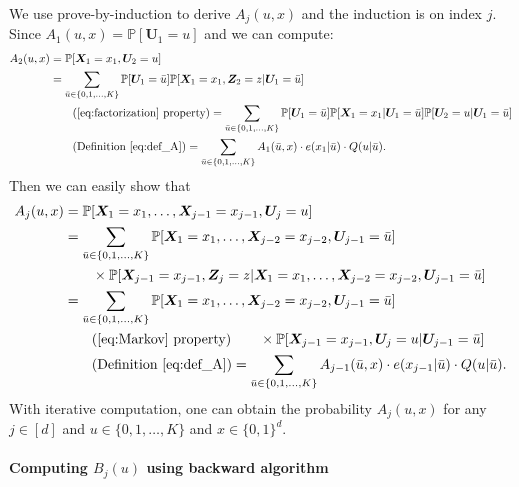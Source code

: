\documentclass[12pt]{article}
\theoremstyle{definition}
\def\P{\mathbb{P}}
\def\P{\mathbb{P}}
\renewcommand{\P}{\mathbb{P}}							%
\newcommand{\prx}{\bm X}								%
\newcommand{\prz}{\bm Z}								%
\newcommand{\pru}{{\bm U}}								%
\begin{document}
We use prove-by-induction to derive $A_j(u,x)$ and the induction is on index $j$. Since $A_1(u,x)=\P[\pru_1=u]$ and we can compute:
\begin{align*}
	A_2(u,x)
	&
	=\P[\prx_1=x_1,\pru_2=u]\\
	&
	=\sum_{\bar u\in\{0,1,\ldots,K\}}\P[\pru_1=\bar u]\P[\prx_1=x_1,\prz_2=z|\pru_1=\bar u]\\
	&\tag{\ref{eq:factorization} property}
	=\sum_{\bar u\in\{0,1,\ldots,K\}}\P[\pru_1=\bar u]\P[\prx_1=x_1|\pru_1=\bar u]\P[\pru_2=u|\pru_1=\bar u]\\
	&\tag{Definition \eqref{eq:def_A}}
	=\sum_{\bar u\in\{0,1,\ldots,K\}}A_1(\bar u,x)\cdot e(x_1|\bar u)\cdot Q(u|\bar u).
\end{align*}
Then we can easily show that 
\begin{align*}
	A_j(u,x)
	&
	=\P[\prx_{1}=x_1,\ldots, \prx_{j-1}=x_{j-1},\pru_{j}=u]\\
	&
	=\sum_{\bar u\in\{0,1,\ldots,K\}}\P[\prx_{1}=x_1,\ldots, \prx_{j-2}=x_{j-2},\pru_{j-1}=\bar u]\\
	&
	\qquad\times\P[\prx_{j-1}=x_{j-1},\prz_{j}=z|\prx_{1}=x_1,\ldots, \prx_{j-2}=x_{j-2},\pru_{j-1}=\bar u]\\
	&
	=\sum_{\bar u\in\{0,1,\ldots,K\}}\P[\prx_{1}=x_1,\ldots, \prx_{j-2}=x_{j-2},\pru_{j-1}=\bar u]\\
	&\tag{\ref{eq:Markov} property}
	\qquad\times\P[\prx_{j-1}=x_{j-1},\pru_{j}=u|\pru_{j-1}=\bar u]\\
	&\tag{Definition \eqref{eq:def_A}}
	=\sum_{\bar u\in\{0,1,\ldots,K\}}A_{j-1}(\bar u,x)\cdot e(x_{j-1}|\bar u)\cdot Q(u|\bar u).
\end{align*}
With iterative computation, one can obtain the probability $A_j(u,x)$ for any $j\in[d]$ and $u\in \{0,1,\ldots,K\}$ and $x\in\{0,1\}^d$.

\paragraph{Computing $B_j(u)$ using backward algorithm}
\end{document}
